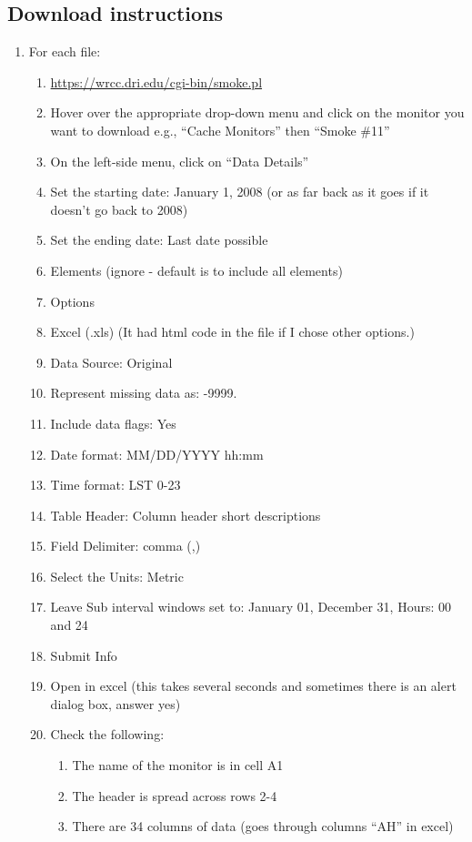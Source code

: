 \subsection*{Download instructions}
\begin{enumerate}
\item For each file:
\begin{enumerate}[nolistsep]
\item \url{https://wrcc.dri.edu/cgi-bin/smoke.pl}
\item Hover over the appropriate drop-down menu and click on the monitor you want to download e.g., “Cache Monitors” then “Smoke \#11”
\item On the left-side menu, click on ``Data Details”
\item Set the starting date: January 1, 2008 (or as far back as it goes if it doesn’t go back to 2008)
\item Set the ending date: Last date possible%
\item Elements (ignore - default is to include all elements)
\item Options
\item Excel (.xls) (It had html code in the file if I chose other options.)
\item Data Source: Original
\item Represent missing data as: -9999.
\item Include data flags: Yes
\item Date format: MM/DD/YYYY hh:mm
\item Time format: LST 0-23
\item Table Header: Column header short descriptions
\item Field Delimiter: comma (,)
\item Select the Units: Metric
\item Leave Sub interval windows set to: January 01, December 31, Hours: 00 and 24
\item Submit Info
\item Open in excel (this takes several seconds and sometimes there is an alert dialog box, answer yes)
\item Check the following:
\begin{enumerate}[nolistsep]
\item The name of the monitor is in cell A1
\item The header is spread across rows 2-4
\item There are 34 columns of data (goes through columns ``AH” in excel)

\end{enumerate}
\end{enumerate}
\end{enumerate}
